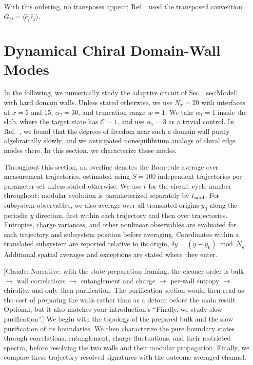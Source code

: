 \documentclass[aps,prb,10pt,twocolumn,superscriptaddress,longbibliography,floatfix]{revtex4-2}
\newcommand{\mc}[1]{\mathcal{#1}}
\newcommand{\claudeadd}[1]{{\color{orange}#1}}
\newcommand{\claudecom}[1]{{\color{ForestGreen}[Claude: #1]}}
\begin{document}
\claudeadd{With this ordering, no transposes appear; Ref.~\cite{BhuiyanPanJian2026} used the transposed convention $G_{ij}=\langle\hat c_i^\dagger\hat c_j\rangle$.}

\FloatBarrier
\section{Dynamical Chiral Domain-Wall Modes}
\label{sec:Results}

In the following, we numerically study the adaptive circuit of Sec.~\ref{sec:Model} with hard domain walls. Unless stated otherwise, we use $N_x=20$ with interfaces at $x=5$ and $15$, $\alpha_2=30$, and truncation range $w=1$. We take $\alpha_1=1$ inside the slab, where the target state has $\mc C=1$, and use $\alpha_1=3$ as a trivial control. In Ref.~\cite{BhuiyanPanJian2026}, we found that the degrees of freedom near such a domain wall purify algebraically slowly, and we anticipated nonequilibrium analogs of chiral edge modes there. In this section, we characterize these modes.
{\color{blue}
Throughout this section, an overline denotes the Born-rule average over measurement trajectories, estimated using $S=100$ independent trajectories per parameter set unless stated otherwise. We use $t$ for the circuit cycle number throughout; modular evolution is parameterized separately by $t_{\rm mod}$. For subsystem observables, we also average over all translated origins $y_0$ along the periodic $y$ direction, first within each trajectory and then over trajectories. Entropies, charge variances, and other nonlinear observables are evaluated for each trajectory and subsystem position before averaging. Coordinates within a translated subsystem are reported relative to its origin, $\delta y=(y-y_0)\bmod N_y$. Additional spatial averages and exceptions are stated where they enter.

\claudecom{Narrative: with the state-preparation framing, the cleaner order is bulk $\to$ wall correlations $\to$ entanglement and charge $\to$ per-wall entropy $\to$ chirality, and only then purification. The purification section would then read as the cost of preparing the walls rather than as a detour before the main result. Optional, but it also matches your introduction's ``Finally, we study slow purification''.} We begin with the topology of the prepared bulk and the slow purification of its boundaries. We then characterize the pure boundary states through correlations, entanglement, charge fluctuations, and their restricted spectra, before resolving the two walls and their modular propagation. Finally, we compare these trajectory-resolved signatures with the outcome-averaged channel.
}
\end{document}
